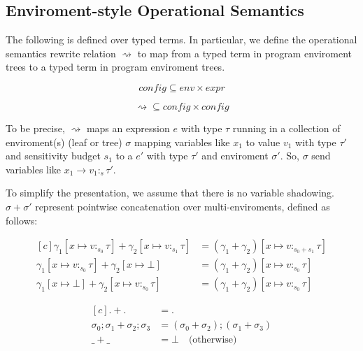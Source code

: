 \iffalse
\subsection{Enviroment-style Operational Semantics}
The following is defined over typed terms. In particular, we define the
operational semantics rewrite relation $\rightsquigarrow$ to map from a typed
term in program enviroment trees to a typed term in program enviroment trees. 

$$
\textit{config} \subseteq \textit{env} \times \textit{expr}
$$

$$
\rightsquigarrow \subseteq \textit{config} \times \textit{config}
$$

To be precise, $\rightsquigarrow$ maps an expression $e$ with type $\tau$
running in a collection of enviroment(s) (leaf or tree) $\sigma$ mapping
variables like $x_1$ to value $v_1$ with type $\tau'$ and sensitivity budget
$s_1$ to a $e'$ with type $\tau'$ and enviroment $\sigma'$. So, $\sigma$ send
variables like $x_1 \to v_1 :_s \tau'$.

To simplify the presentation, we assume that there is no variable shadowing.
$\sigma + \sigma'$ represent pointwise concatenation over multi-enviroments,
defined as follows:

\begin{definition}
  \begin{equation}
    \begin{aligned}[c]
      \gamma_1[x \mapsto v :_{s_0} \tau] 
        + 
      \gamma_2[x \mapsto v:_{s_1} \tau] 
        &= 
      (\gamma_1 + \gamma_2) [x \mapsto v :_{s_0 + s_1} \tau] \\
      \gamma_1[x \mapsto v :_{s_0} \tau] 
        + 
      \gamma_2[x \mapsto \bot] 
        &= 
      (\gamma_1 + \gamma_2) [x \mapsto v :_{s_0} \tau] \\
      \gamma_1[x \mapsto \bot] 
        + 
      \gamma_2[x \mapsto v :_{s_0} \tau] 
        &= 
      (\gamma_1 + \gamma_2) [x \mapsto v :_{s_0} \tau]
    \end{aligned}
  \end{equation}
\end{definition}

\begin{definition}
  \begin{equation}
    \begin{aligned}[c]
      . + . &=  . \\ 
      \sigma_0;\sigma_1 + \sigma_2;\sigma_3 &= (\sigma_0 + \sigma_2);(\sigma_1 + \sigma_3) \\ 
      \_ + \_ &= \bot \quad{\text{(otherwise)}}
    \end{aligned}
  \end{equation}
\end{definition}

